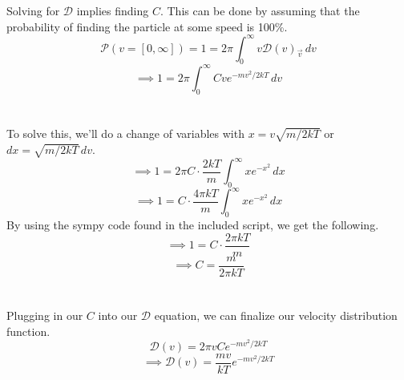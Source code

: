 \documentclass[12pt]{article}
\begin{document}
\begin{flushleft}
Solving for $\mathcal{D}$ implies finding $C$. This can be done by assuming that the probability of finding the particle at some speed is 100\%.
$$\mathcal{P}(v=[0,\infty])=1=2\pi\int_0^\infty v\mathcal{D}(v)_{\vec{v}}\,dv$$
$$\implies1=2\pi\int_0^\infty Cve^{-mv^2/2kT}\,dv$$\\~\\

To solve this, we'll do a change of variables with $x=v\sqrt{m/2kT}$ or $dx=\sqrt{m/2kT}\,dv$.
$$\implies1=2\pi C\cdot\frac{2kT}{m}\int_0^\infty xe^{-x^2}\,dx$$
$$\implies1=C\cdot\frac{4\pi kT}{m}\int_0^\infty xe^{-x^2}\,dx$$
By using the sympy code found in the included script, we get the following.
$$\implies1=C\cdot\frac{2\pi kT}{m}$$
$$\implies C=\frac{m}{2\pi kT}$$\\~\\

Plugging in our $C$ into our $\mathcal{D}$ equation, we can finalize our velocity distribution function.
$$\mathcal{D}(v)=2\pi vCe^{-mv^2/2kT}$$
$$\implies\mathcal{D}(v)=\frac{mv}{kT}e^{-mv^2/2kT}$$









\end{flushleft}
\end{document}
